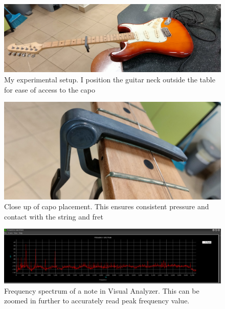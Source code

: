 \FloatBarrier
\begin{figure}[!htb]
    \includegraphics[width = \textwidth]{ee/experiment_setup.jpg}
    \caption{My experimental setup. I position the guitar neck outside the table for ease of access to the capo} \label{fig5}
\end{figure}
\begin{figure}[!htb]
    \includegraphics[angle=270, width = \textwidth]{ee/capo_on_fret.jpg}
    \caption{Close up of capo placement. This ensures consistent pressure and contact with the string and fret} \label{fig6}
\end{figure}
\begin{figure}[!htb]
    \includegraphics[width = \textwidth]{./ee/freq.png}
    \caption{Frequency spectrum of a note in Visual Analyzer. This can be zoomed in further to accurately read peak frequency value.} \label{fig7}
\end{figure}
\FloatBarrier